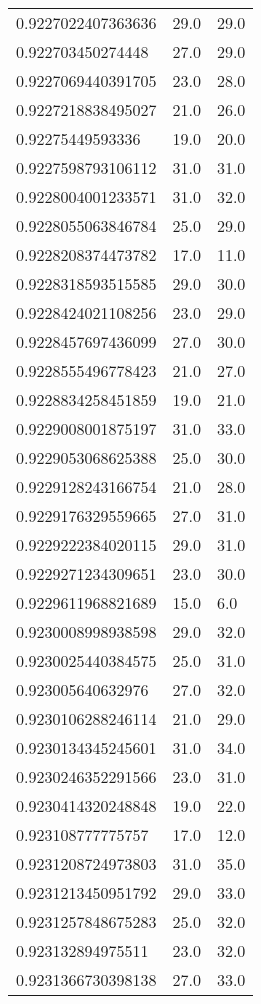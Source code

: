 \begin{center}
\begin{supertabular}[H]{p{0.30\textwidth}p{0.05\textwidth}p{0.05\textwidth}}
0.9227022407363636 & 29.0 & 29.0 \\ 
0.922703450274448 & 27.0 & 29.0 \\ 
0.9227069440391705 & 23.0 & 28.0 \\ 
0.9227218838495027 & 21.0 & 26.0 \\ 
0.92275449593336 & 19.0 & 20.0 \\ 
0.9227598793106112 & 31.0 & 31.0 \\ 
0.9228004001233571 & 31.0 & 32.0 \\ 
0.9228055063846784 & 25.0 & 29.0 \\ 
0.9228208374473782 & 17.0 & 11.0 \\ 
0.9228318593515585 & 29.0 & 30.0 \\ 
0.9228424021108256 & 23.0 & 29.0 \\ 
0.9228457697436099 & 27.0 & 30.0 \\ 
0.9228555496778423 & 21.0 & 27.0 \\ 
0.9228834258451859 & 19.0 & 21.0 \\ 
0.9229008001875197 & 31.0 & 33.0 \\ 
0.9229053068625388 & 25.0 & 30.0 \\ 
0.9229128243166754 & 21.0 & 28.0 \\ 
0.9229176329559665 & 27.0 & 31.0 \\ 
0.9229222384020115 & 29.0 & 31.0 \\ 
0.9229271234309651 & 23.0 & 30.0 \\ 
0.9229611968821689 & 15.0 & 6.0 \\ 
0.9230008998938598 & 29.0 & 32.0 \\ 
0.9230025440384575 & 25.0 & 31.0 \\ 
0.923005640632976 & 27.0 & 32.0 \\ 
0.9230106288246114 & 21.0 & 29.0 \\ 
0.9230134345245601 & 31.0 & 34.0 \\ 
0.9230246352291566 & 23.0 & 31.0 \\ 
0.9230414320248848 & 19.0 & 22.0 \\ 
0.923108777775757 & 17.0 & 12.0 \\ 
0.9231208724973803 & 31.0 & 35.0 \\ 
0.9231213450951792 & 29.0 & 33.0 \\ 
0.9231257848675283 & 25.0 & 32.0 \\ 
0.923132894975511 & 23.0 & 32.0 \\ 
0.9231366730398138 & 27.0 & 33.0 \\ 

\end{supertabular}
\end{center}
